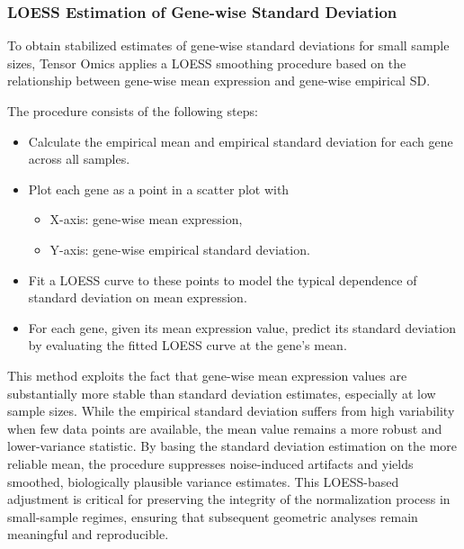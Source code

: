         \subsubsection{LOESS Estimation of Gene-wise Standard Deviation}\label{gene_sd_loess_alg}

        To obtain stabilized estimates of gene-wise standard deviations for small
        sample sizes, Tensor Omics applies a LOESS smoothing procedure based on the
        relationship between gene-wise mean expression and gene-wise empirical SD.

        The procedure consists of the following steps:

        \begin{itemize}
            \item Calculate the empirical mean and empirical standard deviation for
              each gene across all samples.
            \item Plot each gene as a point in a scatter plot with
            \begin{itemize}
                \item X-axis: gene-wise mean expression,
                \item Y-axis: gene-wise empirical standard deviation.
            \end{itemize}
            \item Fit a LOESS curve to these points to model the typical dependence of
              standard deviation on mean expression.
            \item For each gene, given its mean expression value, predict its standard
              deviation by evaluating the fitted LOESS curve at the gene's mean.
        \end{itemize}

        This method exploits the fact that gene-wise mean expression values are
        substantially more stable than standard deviation estimates, especially at low
        sample sizes. While the empirical standard deviation suffers from high
        variability when few data points are available, the mean value remains a more
        robust and lower-variance statistic. By basing the standard deviation
        estimation on the more reliable mean, the procedure suppresses noise-induced
        artifacts and yields smoothed, biologically plausible variance estimates. This
        LOESS-based adjustment is critical for preserving the integrity of the
        normalization process in small-sample regimes, ensuring that subsequent
        geometric analyses remain meaningful and reproducible.